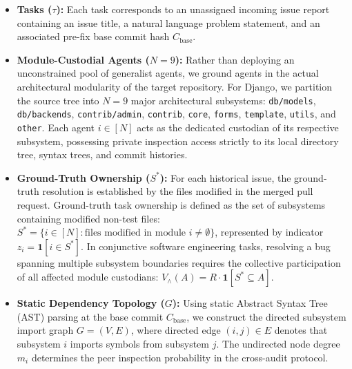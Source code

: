 \documentclass{article}
\theoremstyle{definition}
\newcommand{\indicator}{\mathbf{1}}
\begin{document}
\begin{itemize}
    \item \textbf{Tasks ($\tau$):} Each task corresponds to an unassigned incoming issue report containing an issue title, a natural language problem statement, and an associated pre-fix base commit hash $C_{\mathrm{base}}$.
    \item \textbf{Module-Custodial Agents ($N=9$):} Rather than deploying an unconstrained pool of generalist agents, we ground agents in the actual architectural modularity of the target repository. For Django, we partition the source tree into $N=9$ major architectural subsystems: \texttt{db/models}, \texttt{db/backends}, \texttt{contrib/admin}, \texttt{contrib}, \texttt{core}, \texttt{forms}, \texttt{template}, \texttt{utils}, and \texttt{other}. Each agent $i \in [N]$ acts as the dedicated custodian of its respective subsystem, possessing private inspection access strictly to its local directory tree, syntax trees, and commit histories.
    \item \textbf{Ground-Truth Ownership ($S^*$):} For each historical issue, the ground-truth resolution is established by the files modified in the merged pull request. Ground-truth task ownership is defined as the set of subsystems containing modified non-test files: $S^* = \{ i \in [N] : \text{files modified in module } i \neq \emptyset \}$, represented by indicator $z_i = \indicator[i \in S^*]$. In conjunctive software engineering tasks, resolving a bug spanning multiple subsystem boundaries requires the collective participation of all affected module custodians: $V_\wedge(A) = R \cdot \indicator[S^* \subseteq A]$.
    \item \textbf{Static Dependency Topology ($G$):} Using static Abstract Syntax Tree (AST) parsing at the base commit $C_{\mathrm{base}}$, we construct the directed subsystem import graph $G = (V, E)$, where directed edge $(i, j) \in E$ denotes that subsystem $i$ imports symbols from subsystem $j$. The undirected node degree $m_i$ determines the peer inspection probability in the cross-audit protocol.
\end{itemize}
\end{document}
